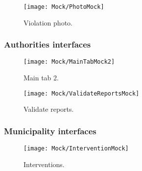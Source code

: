 \begin{figure}[H]
	\centering
	\begin{minipage}[b]{0.99\linewidth}
		\texttt{[image: Mock/PhotoMock]}
		\caption{Violation photo.}
	\end{minipage}
\end{figure}

\subsubsection{Authorities interfaces}

\begin{figure}[H]
	\centering
	\begin{minipage}[b]{0.4\linewidth}
		\texttt{[image: Mock/MainTabMock2]}
		\caption{Main tab 2.}
		\label{mainTab2}
	\end{minipage}
	\begin{minipage}[b]{0.4\linewidth}
		\texttt{[image: Mock/ValidateReportsMock]}
		\caption{Validate reports.}
	\end{minipage}
\end{figure}

\subsubsection{Municipality interfaces}

\begin{figure}[H]
	\centering
	\begin{minipage}[b]{0.4\linewidth}
	    \texttt{[image: Mock/InterventionMock]}
	    \caption{Interventions.}
	\end{minipage}
\end{figure}




